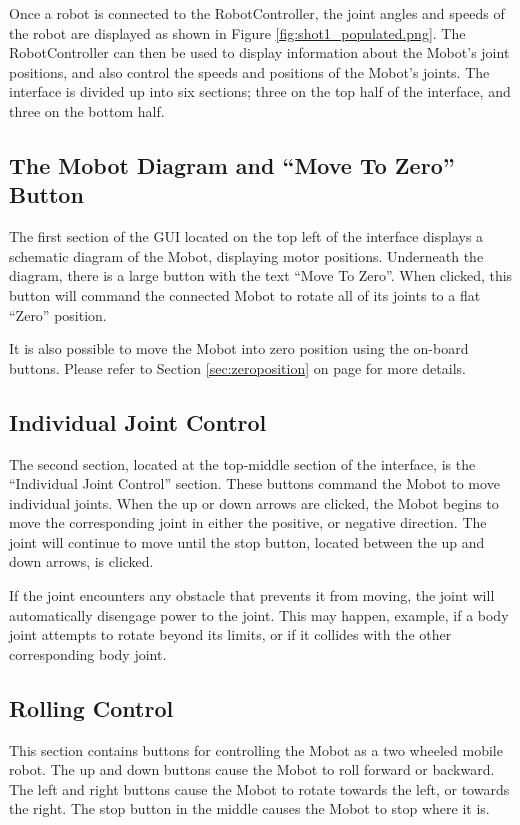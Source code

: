 \documentclass{article}
\begin{document}
Once a robot is connected to the RobotController, the joint angles and speeds
of the robot are displayed as shown in Figure \ref{fig:shot1_populated.png}.
The RobotController can then be
used to display
information about the Mobot's joint positions, and also control the
speeds and positions of the Mobot's joints. The interface is divided
up into six sections; three on the top half of the interface, and three on 
the bottom half. 

\subsection{The Mobot Diagram and ``Move To Zero'' Button}
The first section of the GUI located on the top left of the interface
displays a schematic diagram of the Mobot, displaying motor positions.
Underneath the diagram, there is a large button with the text 
``Move To Zero''. When clicked, this button will command the connected
Mobot to rotate all of its joints to a flat ``Zero'' position.

It is also possible to move the Mobot into zero position using the
on-board buttons. Please refer to Section \ref{sec:zeroposition} on
page \pageref{sec:zeroposition} for more details.

\subsection{Individual Joint Control}
The second section, located at the top-middle section of the interface,
is the ``Individual Joint Control'' section. These buttons command the
Mobot to move individual joints. When the up or down arrows are clicked,
the Mobot begins to move the corresponding joint in either the positive,
or negative direction. The joint will continue to move until the stop 
button, located between the up and down arrows, is clicked. 

If the joint encounters any obstacle that prevents it from moving, the 
joint will automatically disengage power to the joint. This may happen, 
example, if a body joint attempts to rotate beyond its limits,
or if it collides with the other corresponding body joint. 

\subsection{Rolling Control}
This section contains buttons for controlling the Mobot as a 
two wheeled mobile robot. The up and down buttons cause the Mobot to
roll forward or backward. The left and right buttons cause the Mobot 
to rotate towards the left, or towards the right. The stop button in the
middle causes the Mobot to stop where it is.
\end{document}
